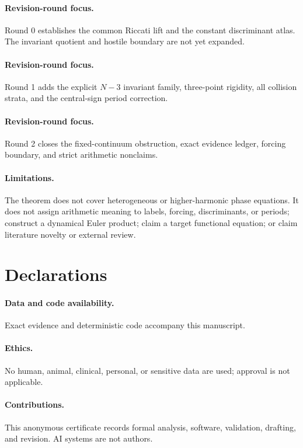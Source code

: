 \documentclass[8pt]{extarticle}
\begin{document}
\ifcase\CRevisionRound
\paragraph{Revision-round focus.} Round 0 establishes the common Riccati
lift and the constant discriminant atlas.  The invariant quotient and hostile
boundary are not yet expanded.
\or
\paragraph{Revision-round focus.} Round 1 adds the explicit $N-3$ invariant
family, three-point rigidity, all collision strata, and the central-sign
period correction.
\or
\paragraph{Revision-round focus.} Round 2 closes the fixed-continuum
obstruction, exact evidence ledger, forcing boundary, and strict arithmetic
nonclaims.
\fi

\paragraph{Limitations.}
The theorem does not cover heterogeneous or higher-harmonic phase equations.
It does not assign arithmetic meaning to labels, forcing, discriminants, or
periods; construct a dynamical Euler product; claim a target functional
equation; or claim literature novelty or external review.

\section*{Declarations}
\paragraph{Data and code availability.} Exact evidence and deterministic code
accompany this manuscript.
\paragraph{Ethics.} No human, animal, clinical, personal, or sensitive data
are used; approval is not applicable.
\paragraph{Contributions.} This anonymous certificate records formal
analysis, software, validation, drafting, and revision. AI systems are not
authors.
\end{document}

